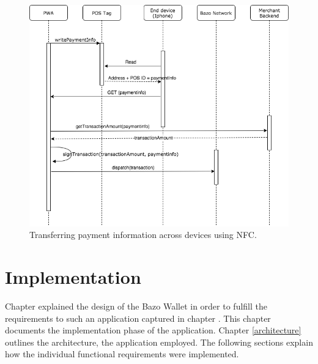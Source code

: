 \begin{figure}
\centering
\includegraphics[width=1\textwidth]{diagrams/POS_flow.png}
\caption{\label{fig:POS}Transferring payment information across devices using NFC.}
\end{figure}








\chapter{Implementation}
Chapter \cite{undefined} explained the design of the Bazo Wallet in order to fulfill the requirements to such an application captured in chapter \cite{undefined}. This chapter documents the implementation phase of the application. Chapter  \ref{architecture} outlines the architecture, the application employed. The following sections explain how the individual functional requirements were implemented.
